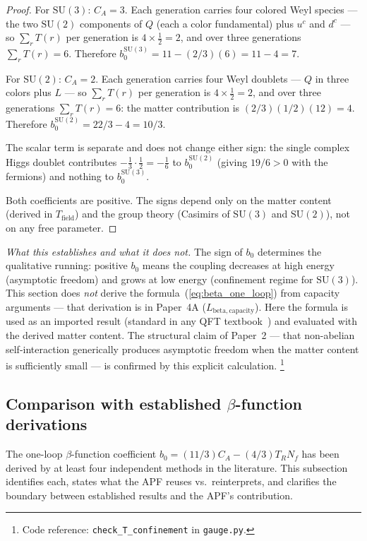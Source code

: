 \documentclass[11pt]{article}
\theoremstyle{definition}
\newcommand{\SU}{\mathrm{SU}}
\newcommand{\coderef}[2]{\footnote{Code reference: \texttt{#1} in \texttt{#2}.}}
\begin{document}
\begin{proof}
For $\SU(3)$: $C_A = 3$.  Each generation carries four colored Weyl
species --- the two $\SU(2)$ components of $Q$ (each a color
fundamental) plus $u^c$ and $d^c$ --- so $\sum_r T(r)$ per generation
is $4 \times \tfrac{1}{2} = 2$, and over three generations
$\sum_r T(r) = 6$.  Therefore
$b_0^{\SU(3)} = 11 - (2/3)(6) = 11 - 4 = 7$.

For $\SU(2)$: $C_A = 2$.  Each generation carries four Weyl doublets
--- $Q$ in three colors plus $L$ --- so $\sum_r T(r)$ per generation
is $4 \times \tfrac{1}{2} = 2$, and over three generations
$\sum_r T(r) = 6$: the matter contribution is $(2/3)(1/2)(12) = 4$.
Therefore $b_0^{\SU(2)} = 22/3 - 4 = 10/3$.

The scalar term is separate and does not change either sign: the
single complex Higgs doublet contributes $-\tfrac{1}{3} \cdot
\tfrac{1}{2} = -\tfrac{1}{6}$ to $b_0^{\SU(2)}$ (giving $19/6 > 0$
with the fermions) and nothing to $b_0^{\SU(3)}$.

Both coefficients are positive.  The signs depend only on the matter
content (derived in $T_{\mathrm{field}}$) and the group theory
(Casimirs of $\SU(3)$ and $\SU(2)$), not on any free parameter.
\end{proof}

\noindent\textit{What this establishes and what it does not.}\quad
The sign of $b_0$ determines the qualitative running: positive $b_0$
means the coupling decreases at high energy (asymptotic freedom) and
grows at low energy (confinement regime for $\SU(3)$).  This section
does \emph{not} derive the formula~(\ref{eq:beta_one_loop}) from
capacity arguments --- that derivation is in Paper~4A
($L_{\mathrm{beta,capacity}}$).  Here the formula is used as an
imported result (standard in any QFT textbook~\cite{PeskinSchroeder1995})
and evaluated with the derived matter content.  The structural claim
of Paper~2 --- that non-abelian self-interaction generically produces
asymptotic freedom when the matter content is sufficiently small ---
is confirmed by this explicit calculation.
\coderef{check\_T\_confinement}{gauge.py}


\subsection{Comparison with established $\beta$-function derivations}
\label{sec:AF_comparison}

The one-loop $\beta$-function coefficient
$b_0 = (11/3)C_A - (4/3)T_R N_f$ has been derived by at least four
independent methods in the literature.  This subsection identifies each,
states what the APF reuses vs.\ reinterprets, and clarifies the
boundary between established results and the APF's contribution.
\end{document}
